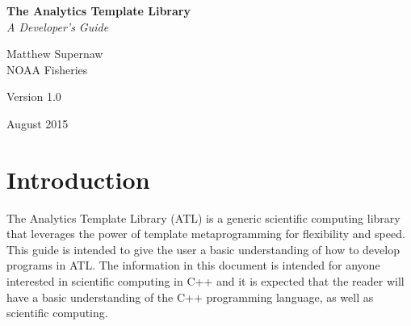 \documentclass[12pt,a4paper]{article}
\begin{document}
\thispagestyle{empty}
\begin{center}
\begin{minipage}{0.75\linewidth}
    \centering
    \vspace{5cm}
    {{\huge \textbf{
    The Analytics Template Library} \\
                        \textit{A Developer's Guide}\par}}
    \vspace{3cm}
    {\Large Matthew Supernaw \\
                 NOAA Fisheries\par}
    \vspace{3cm}

    \vspace{3cm}
    {\Large Version 1.0} \\
    {\Large August 2015\par}
\end{minipage}
\end{center}
\clearpage

\pagestyle{empty}

\tableofcontents

\newpage

\section{Introduction}
The Analytics Template Library (ATL) is a generic scientific computing library that leverages the power of template metaprogramming for flexibility and speed.  This guide is intended to give the user a basic understanding of how to develop programs in ATL. The information in this document is intended for anyone interested in scientific computing in C++ and it is expected that the reader will have a basic understanding of the C++ programming language, as well as scientific computing.
\end{document}
